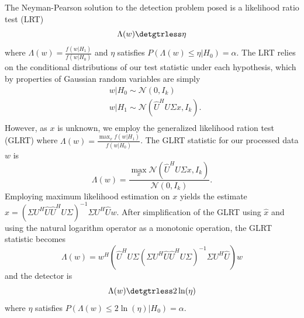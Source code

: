 The Neyman-Pearson solution to the detection problem posed is a likelihood ratio test (LRT)
\begin{equation*}
\Lambda(w) \detgtrless \eta
\end{equation*}
where $\Lambda(w) = \frac{f(w|H_1)}{f(w|H_0)}$ and $\eta$ satisfies $P(\Lambda(w)\leq\eta|H_0)=\alpha$. The LRT relies on the conditional distributions of our test statistic under each hypothesis, which by properties of Gaussian random variables are simply
\begin{equation*}
\begin{aligned}
&w|H_0\sim\mathcal{N}(0,I_{k})\\
&w|H_1\sim\mathcal{N}(\widehat{U}^HU\Sigma x, I_{k}).\\
\end{aligned}
\end{equation*}
However, as $x$ is unknown, we employ the generalized likelihood ration test (GLRT) where $\Lambda(w) = \frac{\max_x f(w|H_1)}{f(w|H_0)}$. The GLRT statistic for our processed data $w$ is
\begin{equation*}
\Lambda(w)=\frac{\max_x\mathcal{N}(\widehat{U}^HU\Sigma x,I_{k})}{\mathcal{N}(0,I_{k})}.
\end{equation*}
Employing maximum likelihood estimation on $x$ yields the estimate $\widehat{x}=\left(\Sigma U^H\widehat{U}\widehat{U}^HU\Sigma\right)^{-1}\Sigma U^H\widehat{U}w$. After simplification of the GLRT using $\widehat{x}$ and using the natural logarithm operator as a monotonic operation, the GLRT statistic becomes
\begin{equation}\label{eq:oracle stat}
\Lambda(w) = w^H\left(\widehat{U}^HU\Sigma\left(\Sigma U^H\widehat{U}\widehat{U}^HU\Sigma\right)^{-1}\Sigma U^H\widehat{U}\right)w
\end{equation}
and the detector is
\begin{equation}\label{eq:oracle classifier}
\Lambda(w) \detgtrless 2\ln(\eta)
\end{equation}
where $\eta$ satisfies $P(\Lambda(w)\leq2\ln\left(\eta\right)|H_0)=\alpha$.

